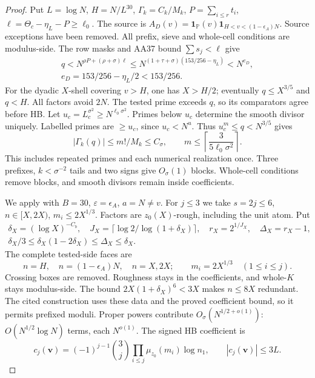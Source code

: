 \begin{proof}
Put $L=\log N$, $H=N/L^{30}$, $\Gamma_k=C_k/M_k$,
$P=\sum_{i\le r}t_i$, $\ell=\Theta_c-\eta_L-P\ge\ell_0$.
The source is $A_D(v)=\mathbf1_{\mathbb P}(v)\mathbf1_{H<v<(1-\epsilon_A)N}$.
Source exceptions have been removed.
All prefix, sieve and whole-cell conditions are modulus-side.
The row masks and AA37 bound $\sum s_j<\ell$ give
\[
\begin{gathered}
 q<N^{\rho P+(\rho+\sigma)\ell}
 \le N^{(1+\tau+\sigma)(153/256-\eta_L)}<N^{e_D},\\
 e_D=153/256-\eta_L/2<153/256.
\end{gathered}
\]
For the dyadic $X$-shell covering $v>H$, one has $X>H/2$;
eventually $q\le X^{3/5}$ and $q<H$.
All factors avoid $2N$.
The tested prime exceeds $q$, so its comparators agree before HB.
Let $u_c=L_c^{\sigma^2}\ge N^{\ell_0\sigma^2}$.
Primes below $u_c$ determine the smooth divisor uniquely.
Labelled primes are $\ge u_c$, since $u_c<N^u$.
Thus $u_c^m\le q<N^{3/5}$ gives
\[
 |\Gamma_k(q)|\le m!/M_k\le C_\sigma,\qquad
 m\le\left\lceil\frac3{5\ell_0\sigma^2}\right\rceil.
\]
This includes repeated primes and each numerical realization once.
Three prefixes, $k<\sigma^{-2}$ tails and two signs give $O_\sigma(1)$ blocks.
Whole-cell conditions remove blocks, and smooth divisors remain inside coefficients.

We apply \cite[(B.7)--(B.13)]{Z1} with
$B=30$, $\varepsilon=\epsilon_A$, $a=N\ne v$.
For $j\le3$ we take $s=2j\le6$, $n\in[X,2X)$, $m_i\le2X^{1/3}$.
Factors are $z_0(X)$-rough, including the unit atom.
Put
\[
\begin{gathered}
 \delta_X=(\log X)^{-C_b},\quad J_X=\lceil\log2/\log(1+\delta_X)\rceil,
 \quad r_X=2^{1/J_X},\quad\Delta_X=r_X-1,\\
 \delta_X/3\le\delta_X(1-2\delta_X)\le\Delta_X\le\delta_X.
\end{gathered}
\]
The complete tested-side faces are
\[
 n=H,\quad n=(1-\epsilon_A)N,\quad n=X,2X;\qquad
 m_i=2X^{1/3}\quad(1\le i\le j).
\]
Crossing boxes are removed.
Roughness stays in the coefficients, and whole-$K$ stays modulus-side.
The bound $2X(1+\delta_X)^6<3X$ makes $n\le8X$ redundant.
The cited construction uses these data and the proved coefficient bound,
so it permits prefixed moduli.
Proper powers contribute $O_\sigma(N^{1/2+o(1)})$:
$O(N^{1/2}\log N)$ terms, each $N^{o(1)}$.
The signed HB coefficient is
\[
 c_j(\mathbf v)=(-1)^{j-1}\binom3j
       \prod_{i\le j}\mu_{z_0}(m_i)\log n_1,\qquad |c_j(\mathbf v)|\le3L.
\]


\end{proof}
